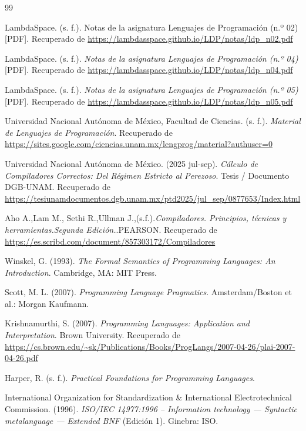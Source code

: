 \documentclass[a4paper,12pt]{article}
\begin{document}
\begin{thebibliography}{99}

LambdaSpace. (s. f.). Notas de la asignatura Lenguajes de Programación (n.º 02)[PDF]. Recuperado de 
\url{https://lambdasspace.github.io/LDP/notas/ldp_n02.pdf}

LambdaSpace. (s. f.). \textit{Notas de la asignatura Lenguajes de Programación (n.º 04)} [PDF]. Recuperado de
\url{https://lambdasspace.github.io/LDP/notas/ldp_n04.pdf}

LambdaSpace. (s. f.). \textit{Notas de la asignatura Lenguajes de Programación (n.º 05)} [PDF]. Recuperado de 
\url{https://lambdasspace.github.io/LDP/notas/ldp_n05.pdf}

Universidad Nacional Autónoma de México, Facultad de Ciencias. (s. f.). \textit{Material de Lenguajes de Programación}. Recuperado de 
\url{https://sites.google.com/ciencias.unam.mx/lengprog/material?authuser=0}

Universidad Nacional Autónoma de México. (2025 jul-sep). \textit{Cálculo de Compiladores Correctos: Del Régimen Estricto al Perezoso}. Tesis / Documento DGB-UNAM. Recuperado de 
\url{https://tesiunamdocumentos.dgb.unam.mx/ptd2025/jul_sep/0877653/Index.html}

Aho A.,Lam M., Sethi R.,Ullman J.,(s.f.).\textit{Compiladores. Principios, técnicas y herramientas.Segunda Edición.}.PEARSON. Recuperado de
\url{https://es.scribd.com/document/857303172/Compiladores}

Winskel, G. (1993). \textit{The Formal Semantics of Programming Languages: An Introduction}. Cambridge, MA: MIT Press.

Scott, M. L. (2007). \textit{Programming Language Pragmatics}. Amsterdam/Boston et al.: Morgan Kaufmann.

Krishnamurthi, S. (2007). \textit{Programming Languages: Application and Interpretation}. Brown University. Recuperado de 
\url{https://cs.brown.edu/~sk/Publications/Books/ProgLangs/2007-04-26/plai-2007-04-26.pdf}

Harper, R. (s. f.). \textit{Practical Foundations for Programming Languages}. 

International Organization for Standardization \& International Electrotechnical Commission. (1996).
\textit{ISO/IEC 14977:1996 – Information technology — Syntactic metalanguage — Extended BNF} (Edición 1). Ginebra: ISO.


\end{thebibliography}
\end{document}
